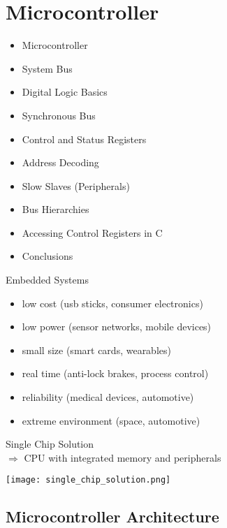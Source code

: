 \section{Microcontroller}

\begin{remark}
    \begin{itemize}
        \item Microcontroller
        \item System Bus
        \item Digital Logic Basics
        \item Synchronous Bus
        \item Control and Status Registers
        \item Address Decoding
        \item Slow Slaves (Peripherals)
        \item Bus Hierarchies
        \item Accessing Control Registers in C
        \item Conclusions
    \end{itemize} 
\end{remark}

\begin{theorem}{Embedded Systems}
    \begin{itemize}
        \item low cost (usb sticks, consumer electronics)
        \item low power (sensor networks, mobile devices)
        \item small size (smart cards, wearables)
        \item real time (anti-lock brakes, process control)
        \item reliability (medical devices, automotive)
        \item extreme environment (space, automotive)
    \end{itemize}
\end{theorem}

\begin{concept}{Single Chip Solution} \\
    $\Rightarrow$ CPU with integrated memory and peripherals
\end{concept}

\texttt{[image: single\_chip\_solution.png]}

\multend

\subsection{Microcontroller Architecture}

